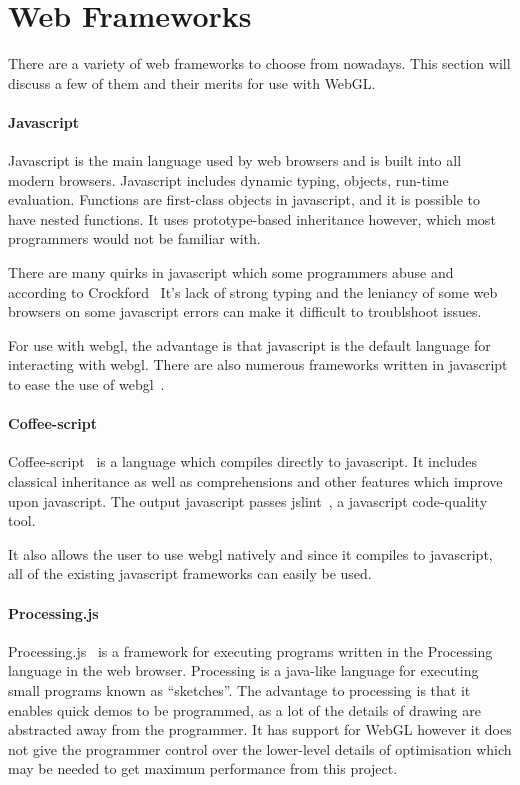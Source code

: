 \documentclass[12pt]{article}
\begin{document}
\section{Web Frameworks}
There are a variety of web frameworks to choose from nowadays.
This section will discuss a few of them and their merits for use with WebGL.

\paragraph{Javascript}
Javascript is the main language used by web browsers and is built into all modern browsers.
Javascript includes dynamic typing, objects, run-time evaluation.
Functions are first-class objects in javascript, and it is possible to have nested functions.
It uses prototype-based inheritance however, which most programmers would not be familiar with.

There are many quirks in javascript which some programmers abuse and according to Crockford~\cite{web:javascriptbadparts}
It's lack of strong typing and the leniancy of some web browsers on some javascript errors can make it difficult to troublshoot issues.

For use with webgl, the advantage is that javascript is the default language for interacting with webgl.
There are also numerous frameworks written in javascript to ease the use of webgl~\cite{web:threejs}\cite{web:copperlicht}. 

\paragraph{Coffee-script}
Coffee-script~\cite{web:coffeescript} is a language which compiles directly to javascript.
It includes classical inheritance as well as comprehensions and other features which improve upon javascript.
The output javascript passes jslint~\cite{web:jslint}, a javascript code-quality tool.

It also allows the user to use webgl natively and since it compiles to javascript, all of the existing javascript frameworks can easily be used.

\paragraph{Processing.js}
Processing.js~\cite{web:processingjs} is a framework for executing programs written in the Processing~\cite{web:processing} language in the web browser.
Processing is a java-like language for executing small programs known as ``sketches''.
The advantage to processing is that it enables quick demos to be programmed, as a lot of the details of drawing are abstracted away from the programmer.
It has support for WebGL however it does not give the programmer control over the lower-level details of optimisation which may be needed to get maximum performance from this project.
\end{document}
